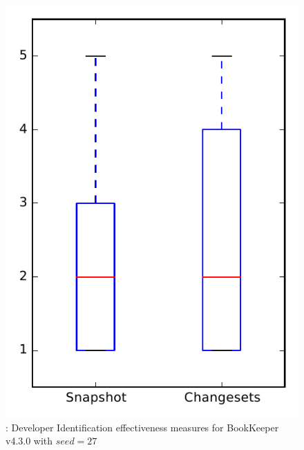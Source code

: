 
\begin{figure}
\centering
\includegraphics[height=0.4\textheight]{figures/dit_seed/rq1_bookkeeper_27}
\caption{\rtwo: Developer Identification effectiveness measures for BookKeeper v4.3.0 with $seed=27$}
\label{fig:dit_seed:rq1:bookkeeper}
\end{figure}
